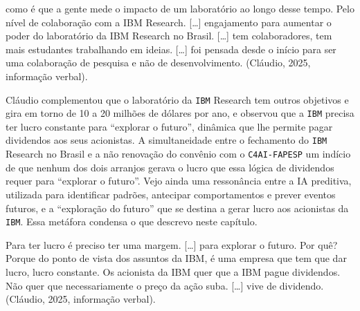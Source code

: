 \begin{citacaoabnt}
como é que a gente mede o impacto de um laboratório ao longo desse tempo. Pelo nível de colaboração com a IBM Research. [\ldots{}] engajamento para aumentar o poder do laboratório da IBM Research no Brasil. [\ldots{}] tem colaboradores, tem mais estudantes trabalhando em ideias. [\ldots{}] foi pensada desde o início para ser uma colaboração de pesquisa e não de desenvolvimento. (Cláudio, 2025, informação verbal).
\end{citacaoabnt}

Cláudio complementou que o laboratório da \texttt{IBM} Research tem outros objetivos e gira em torno de 10 a 20 milhões de dólares por ano, e observou que a \texttt{IBM} precisa ter lucro constante para \enquote{explorar o futuro}, dinâmica que lhe permite pagar dividendos aos seus acionistas. A simultaneidade entre o fechamento do \texttt{IBM} Research no Brasil e a não renovação do convênio com o \texttt{C4AI-FAPESP} um indício de que nenhum dos dois arranjos gerava o lucro que essa lógica de dividendos requer para \enquote{explorar o futuro}. Vejo ainda uma ressonância entre a IA preditiva, utilizada para identificar padrões, antecipar comportamentos e prever eventos futuros, e a \enquote{exploração do futuro} que se destina a gerar lucro aos acionistas da \texttt{IBM}. Essa metáfora condensa o que descrevo neste capítulo.

\begin{citacaoabnt}
Para ter lucro é preciso ter uma margem. [\ldots{}] para explorar o futuro. Por quê? Porque do ponto de vista dos assuntos da IBM, é uma empresa que tem que dar lucro, lucro constante. Os acionista da IBM quer que a IBM pague dividendos. Não quer que necessariamente o preço da ação suba. [\ldots{}] vive de dividendo. (Cláudio, 2025, informação verbal).
\end{citacaoabnt}

